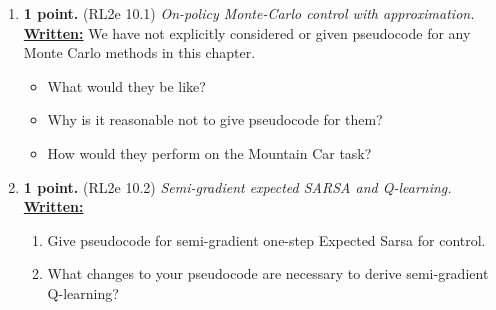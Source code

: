 \documentclass{article}
\begin{document}
\begin{enumerate}


\item \textbf{1 point.} (RL2e 10.1) \textit{On-policy Monte-Carlo control with approximation.} \\
\uline{\textbf{Written:}} We have not explicitly considered or given pseudocode for any Monte Carlo methods in this chapter. 
\begin{itemize}
    \item What would they be like?
    \item Why is it reasonable not to give pseudocode for them?
    \item How would they perform on the Mountain Car task? 
\end{itemize}


\item \textbf{1 point.} (RL2e 10.2) \textit{Semi-gradient expected SARSA and Q-learning.} \\
\uline{\textbf{Written:}}
\begin{enumerate}
\item Give pseudocode for semi-gradient one-step Expected Sarsa for control.

\item What changes to your pseudocode are necessary to derive semi-gradient Q-learning?

\end{enumerate}


\end{enumerate}
\end{document}
